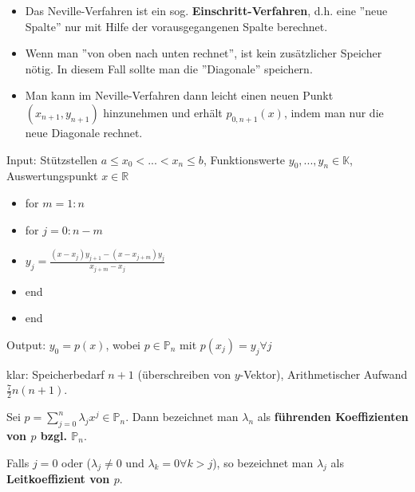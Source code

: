 \begin{remark}
	\begin{itemize}
		\item Das Neville-Verfahren ist ein sog. \textbf{Einschritt-Verfahren}, d.h. eine ''neue Spalte'' nur mit Hilfe der vorausgegangenen Spalte berechnet.
		\item Wenn man ''von oben nach unten rechnet'', ist kein zusätzlicher Speicher nötig. In diesem Fall sollte man die ''Diagonale'' speichern.
		\item Man kann im Neville-Verfahren dann leicht einen neuen Punkt $(x_{n+1}, y_{n+1})$ hinzunehmen und erhält $p_{0,n+1}(x)$, indem man nur die neue Diagonale rechnet.
	\end{itemize}
\end{remark}

\begin{algorithm}[Neville]
	Input: Stützstellen $a \leq x_0 < ... < x_n \leq b$, Funktionswerte $y_0, ..., y_n \in \mathbb{K}$, Auswertungspunkt $x \in \mathbb{R}$
	
	\begin{itemize}
		\item for $m=1:n$
		\item \hspace{0.5cm} for $j=0:n-m$
		\item \hspace{1cm} $y_j = \frac{(x-x_j)y_{j+1} - (x-x_{j+m})y_j}{x_{j+m}-x_j}$
		\item \hspace{0.5cm} end
		\item end
	\end{itemize}
	
	Output: $y_0 = p(x)$, wobei $p \in \mathbb{P}_n$ mit $p(x_j) = y_j \forall j$
	
	klar: Speicherbedarf $n+1$ (überschreiben von $y$-Vektor), Arithmetischer Aufwand $\frac{7}{2}n(n+1)$.
\end{algorithm}

\begin{definition}
	Sei $p = \sum_{j=0}^{n} \lambda_j x^j \in \mathbb{P}_n$. Dann bezeichnet man $\lambda_n$ als \textbf{führenden Koeffizienten von $p$ bzgl. $\mathbb{P}_n$}.
	
	Falls $j=0$ oder ($\lambda_j \neq 0$ und $\lambda_k = 0 \forall k > j$), so bezeichnet man $\lambda_j$ als \textbf{Leitkoeffizient von $p$}.
\end{definition}

